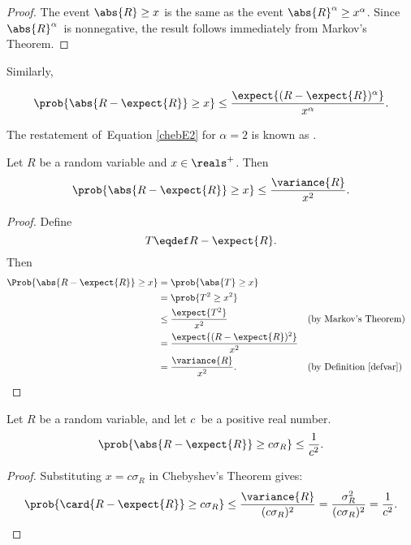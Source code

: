 \begin{proof}
The event $\abs{R} \ge x$ is the same as the event $\abs{R}^\alpha \ge
x^\alpha$.  Since $\abs{R}^\alpha$~is nonnegative, the result follows
immediately from Markov's Theorem.
\end{proof}

Similarly,

\begin{equation}\label{chebE2}
\prob{\abs{R - \expect{R}} \geq x}
    \leq \frac{\expect{(R - \expect{R})^\alpha}}{x^\alpha}.
\end{equation}

The restatement of~Equation \ref{chebE2} for $\alpha=2$ is known as
.
\begin{theorem}[Chebyshev]\label{chebthm}
  Let $R$ be a random variable and $x \in \reals^+$.  Then
\[
\prob{\abs{R - \expect{R}} \geq x} \leq \frac{\variance{R}}{x^2}.
\]
\end{theorem}

\begin{proof}

Define
\begin{equation*}
    T \eqdef R - \expect{R}.
\end{equation*}
Then
\begin{align*}
\Prob{ \abs{R - \expect{R}} \ge x }
    &= \prob{\abs{T} \ge x} \\
     &= \prob{T^2 \ge x^2} \\
     &\le \frac{\expect{T^2}}{x^2} && \text{(by Markov's Theorem)} \\
     & = \frac{ \expect{ (R - \expect{R})^2 } }{x^2} \\
     &= \frac{\variance{R}}{x^2}.  && \text{(by Definition~\ref{defvar})}
    \qedhere
\end{align*}
\end{proof}


\begin{corollary}
\label{cor:cheby}
Let $R$ be a random variable, and let $c$~be a positive real number.
\[
\prob{\abs{R - \expect{R}} \geq c \sigma_R} \leq \frac{1}{c^2}.
\]
\end{corollary}

\begin{proof}
  Substituting $x = c \sigma_R$ in Chebyshev's Theorem gives:
  \begin{equation*}
    \prob{\card{R - \expect{R}} \geq c \sigma_R}
    \leq
    \frac{\variance{R}}{(c \sigma_R)^2}
    =  \frac{\sigma_R^2}{(c \sigma_R)^2}
    = \frac{1}{c^2}.\qedhere
  \end{equation*}
\end{proof}

